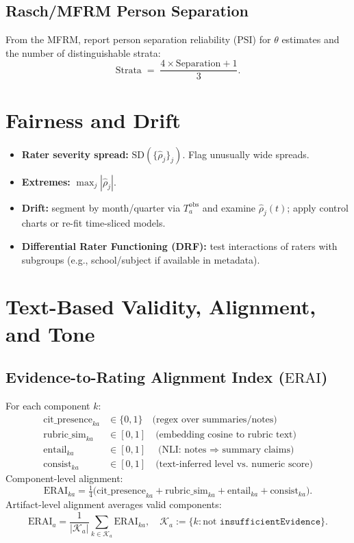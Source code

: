 \documentclass[11pt]{article}
\newcommand{\ERAI}{\mathrm{ERAI}}
\newcommand{\PSI}{\mathrm{PSI}}
\begin{document}
\subsection{Rasch/MFRM Person Separation}
From the MFRM, report person separation reliability ($\PSI$) for $\theta$ estimates and the number of distinguishable strata:
\begin{equation}
\text{Strata} \;=\; \frac{4 \times \text{Separation} + 1}{3}.
\end{equation}

\section{Fairness and Drift}
\begin{itemize}[leftmargin=2em]
  \item \textbf{Rater severity spread:} $\mathrm{SD}(\{\widehat{\rho}_j\}_j)$. Flag unusually wide spreads.
  \item \textbf{Extremes:} $\max_j |\widehat{\rho}_j|$.
  \item \textbf{Drift:} segment by month/quarter via $T^{\mathrm{obs}}_a$ and examine $\widehat{\rho}_j(t)$; apply control charts or re-fit time-sliced models. 
  \item \textbf{Differential Rater Functioning (DRF):} test interactions of raters with subgroups (e.g., school/subject if available in metadata).
\end{itemize}

\section{Text-Based Validity, Alignment, and Tone}
\subsection{Evidence-to-Rating Alignment Index ($\ERAI$)}
For each component $k$:
\begin{align}
\mathrm{cit\_presence}_{k a} &\in \{0,1\} \quad\text{(regex over summaries/notes)}\\
\mathrm{rubric\_sim}_{k a} &\in [0,1] \quad\text{(embedding cosine to rubric text)}\\
\mathrm{entail}_{k a} &\in [0,1] \quad\text{(NLI: notes $\Rightarrow$ summary claims)}\\
\mathrm{consist}_{k a} &\in [0,1] \quad\text{(text-inferred level vs.\ numeric score)}
\end{align}
Component-level alignment:
\begin{equation}
\ERAI_{k a} = \tfrac{1}{4}\bigl(\mathrm{cit\_presence}_{k a} + \mathrm{rubric\_sim}_{k a} + \mathrm{entail}_{k a} + \mathrm{consist}_{k a}\bigr).
\end{equation}
Artifact-level alignment averages valid components:
\begin{equation}
\ERAI_{a} = \frac{1}{|\mathcal{K}_a|}\sum_{k \in \mathcal{K}_a} \ERAI_{k a}, \quad \mathcal{K}_a := \{k: \text{not } \texttt{insufficientEvidence}\}.
\end{equation}
\end{document}
